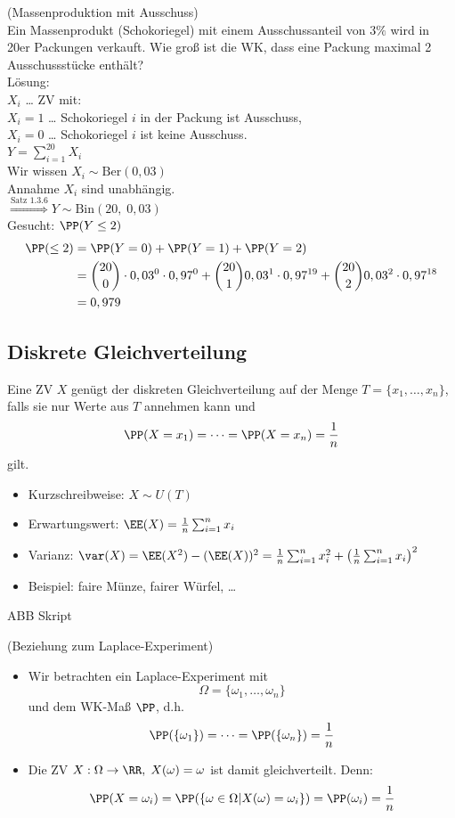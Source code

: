  (Massenproduktion mit Ausschuss)\\
Ein Massenprodukt (Schokoriegel) mit einem Ausschussanteil von $3\%$ wird in 20er Packungen verkauft. Wie groß ist die WK, dass eine Packung maximal 2 Ausschussstücke enthält?\\
Lösung:\\
$X_i$ … ZV mit:\\
$X_i=1 $ … Schokoriegel $i$ in der Packung ist Ausschuss,\\
$X_i = 0 $ … Schokoriegel $i$ ist keine Ausschuss.\\
$Y=\sum_{i=1}^{20}X_i$\\
Wir wissen $X_i \sim \mathrm{Ber}(0,03)$\\
Annahme $X_i$ sind unabhängig.\\
$\overset{\text{Satz 1.3.6}}{\Longrightarrow} Y \sim \mathrm{Bin}(20,\; 0,03)$\\
Gesucht: $\PP(Y \leq 2)$
\begin{align*}
\PP(\leq 2)&= \PP(Y=0)+\PP(Y=1) + \PP(Y=2)\\
&= \binom{20}{0}\cdot 0,03^0 \cdot 0,97^0 + \binom{20}{1} 0,03^1 \cdot 0,97^{19} + \binom{20}{2} 0,03^2 \cdot 0,97^{18}\\
&= 0,979
\end{align*}

\subsection{Diskrete Gleichverteilung}

 Eine ZV $X$ genügt der diskreten Gleichverteilung auf der Menge $T=\{x_1,\dots,x_n\}$, falls sie nur Werte aus $T$ annehmen kann und 
$$\PP(X=x_1) = \dots = \PP(X=x_n) = \frac{1}{n}$$
gilt.

\begin{itemize}
\item Kurzschreibweise: $X\sim U(T)$
\item Erwartungswert: $\EE(X)=\frac{1}{n}\sum_{i=1}^n x_i$
\item Varianz: $\var(X)=\EE(X^2)-(\EE(X))^2 = \frac{1}{n} \sum_{i=1}^n x_i^2+\left(\frac{1}{n}\sum_{i=1}^n x_i\right)^2$
\item Beispiel: faire Münze, fairer Würfel, …
\end{itemize}
ABB Skript

 (Beziehung zum Laplace-Experiment)
\begin{itemize}
\item Wir betrachten ein Laplace-Experiment mit 
$$\Omega = \{\omega_1, \dots, \omega_n\}$$ 
und dem WK-Maß $\PP$, d.h. 
$$\PP(\{\omega_1\})=\dots= \PP(\{\omega_n\})=\frac{1}{n}$$
\item Die ZV $X:\Omega \to \RR, \; X(\omega) = \omega$ ist damit gleichverteilt. Denn: 
$$\PP(X=\omega_i)=\PP(\{\omega\in \Omega | X(\omega) = \omega_i\})=\PP(\omega_i)=\frac{1}{n}$$
\end{itemize}

